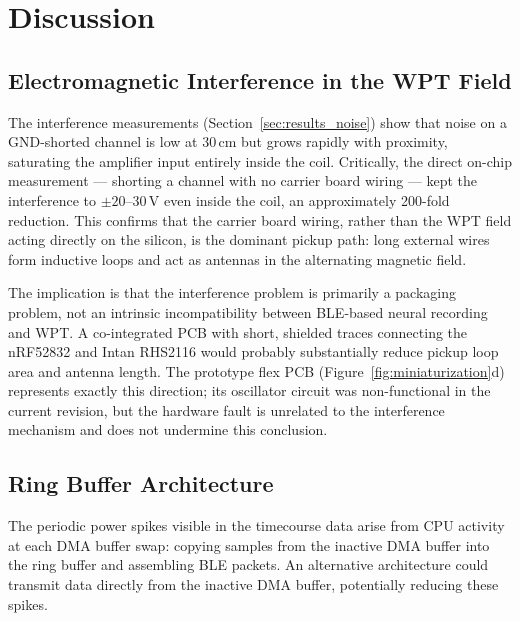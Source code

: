 \clearpage
\section{Discussion}
\label{sec:discussion}

\subsection{Electromagnetic Interference in the WPT Field}

The interference measurements (Section~\ref{sec:results_noise}) show that noise on
a GND-shorted channel is low at 30\,cm but grows rapidly with proximity, saturating
the amplifier input entirely inside the coil. Critically, the direct on-chip
measurement --- shorting a channel with no carrier board wiring --- kept the
interference to $\pm20$--$30$\,\textmu{}V even inside the coil, an approximately
200-fold reduction. This confirms that the
carrier board wiring, rather than the WPT field acting directly on the silicon, is
the dominant pickup path: long external wires form inductive loops and act as
antennas in the alternating magnetic field.

The implication is that the interference problem is primarily a packaging problem,
not an intrinsic incompatibility between BLE-based neural recording and WPT.
A co-integrated PCB with short, shielded traces connecting the nRF52832 and Intan
RHS2116 would probably substantially reduce pickup loop area and antenna length. The
prototype flex PCB (Figure~\ref{fig:miniaturization}d) represents exactly this
direction; its oscillator circuit was non-functional in the current revision, but
the hardware fault is unrelated to the interference mechanism and does not
undermine this conclusion.

\subsection{Ring Buffer Architecture}
\label{sec:discussion_ringbuffer}

The periodic power spikes visible in the timecourse data arise from CPU activity
at each DMA buffer swap: copying samples from the inactive DMA buffer into the
ring buffer and assembling BLE packets. An alternative architecture could transmit
data directly from the inactive DMA buffer, potentially reducing these spikes.

